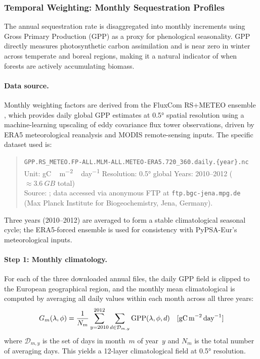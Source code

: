 \documentclass[12pt, a4paper]{article}
\begin{document}
\subsubsection{Temporal Weighting: Monthly Sequestration Profiles}
\label{sec:affo_temporal}

The annual sequestration rate is disaggregated into monthly increments using
Gross Primary Production (GPP) as a proxy for phenological seasonality.
GPP directly measures photosynthetic carbon assimilation and is near zero in
winter across temperate and boreal regions, making it a natural indicator of
when forests are actively accumulating biomass.

\paragraph{Data source.}
Monthly weighting factors are derived from the FluxCom RS+METEO ensemble
\citep{Jung2020}, which provides daily global GPP estimates at \ang{0.5}
spatial resolution using a machine-learning upscaling of eddy covariance flux
tower observations, driven by ERA5 meteorological reanalysis and MODIS
remote-sensing inputs. The specific dataset used is:

\begin{quote}
\small
\texttt{GPP.RS\_METEO.FP-ALL.MLM-ALL.METEO-ERA5.720\_360.daily.\{year\}.nc}\\[2pt]
Unit: \si{gC\,m^{-2}\,day^{-1}} \quad
Resolution: \ang{0.5} global \quad
Years: 2010--2012 (${\approx}\SI{3.6}{GB}$ total)\\
Source: \citet{Jung2020}; data accessed via anonymous FTP at
\texttt{ftp.bgc-jena.mpg.de} (Max Planck Institute for Biogeochemistry,
Jena, Germany).
\end{quote}

Three years (2010--2012) are averaged to form a stable climatological seasonal
cycle; the ERA5-forced ensemble is used for consistency with PyPSA-Eur's
meteorological inputs.


\paragraph{Step 1: Monthly climatology.}
For each of the three downloaded annual files, the daily GPP field is clipped
to the European geographical region, and the monthly mean climatological is  computed by averaging all daily values
within each month across all three years:
\begin{equation}
    G_m(\lambda, \phi)
    = \frac{1}{N_m} \sum_{y=2010}^{2012} \sum_{d \in \mathcal{D}_{m,y}}
      \text{GPP}(\lambda, \phi, d)
    \quad [\text{gC\,m}^{-2}\,\text{day}^{-1}]
    \label{eq:gpp_climatology}
\end{equation}
where $\mathcal{D}_{m,y}$ is the set of days in month~$m$ of year~$y$ and
$N_m$ is the total number of averaging days. This yields a 12-layer
climatological field at \ang{0.5} resolution.
\end{document}
